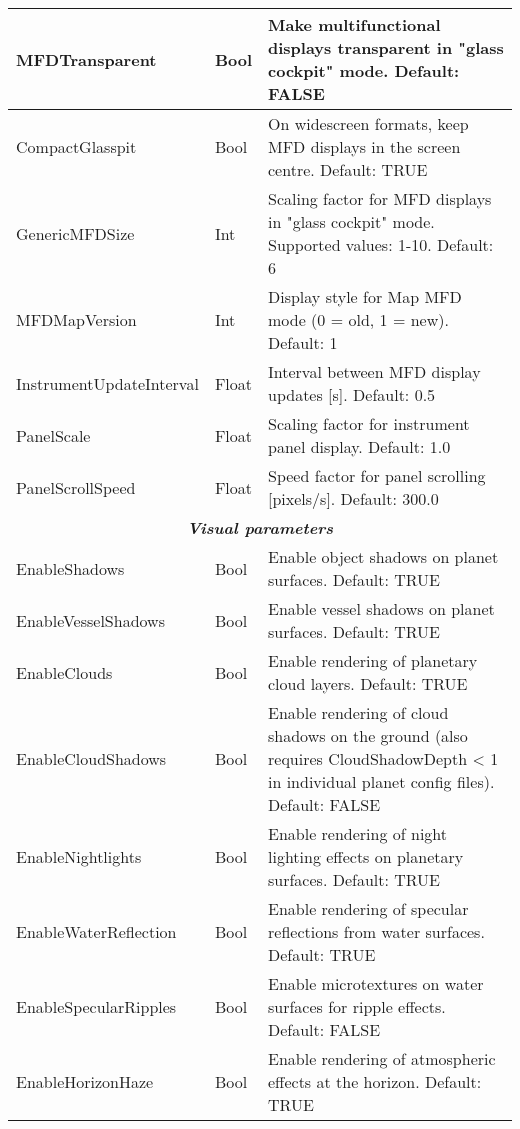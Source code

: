 \documentclass[Orbiter User Manual.tex]{subfiles}
\begin{document}
\begin{longtable}{ |p{}|p{}|p{}| }
	\hline\rule{0pt}{2ex}
	MFDTransparent & Bool & Make multifunctional displays transparent in "glass cockpit" mode. Default: FALSE\\
	\hline\rule{0pt}{2ex}
	CompactGlasspit & Bool & On widescreen formats, keep MFD displays in the screen centre. Default: TRUE\\
	\hline\rule{0pt}{2ex}
	GenericMFDSize & Int & Scaling factor for MFD displays in "glass cockpit" mode. Supported values: 1-10. Default: 6\\
	\hline\rule{0pt}{2ex}
	MFDMapVersion & Int & Display style for Map MFD mode (0 = old, 1 = new). Default: 1\\
	\hline\rule{0pt}{2ex}
	InstrumentUpdateInterval & Float & Interval between MFD display updates [s]. Default: 0.5\\
	\hline\rule{0pt}{2ex}
	PanelScale & Float & Scaling factor for instrument panel display. Default: 1.0\\
	\hline\rule{0pt}{2ex}
	PanelScrollSpeed & Float & Speed factor for panel scrolling [pixels/s]. Default: 300.0\\
	\hline
	\multicolumn{3}{|c|}{\rule{0pt}{2ex}\textbf{\textit{Visual parameters}}}\\
	\hline\rule{0pt}{2ex}
	EnableShadows & Bool & Enable object shadows on planet surfaces. Default: TRUE\\
	\hline\rule{0pt}{2ex}
	EnableVesselShadows & Bool & Enable vessel shadows on planet surfaces. Default: TRUE\\
	\hline\rule{0pt}{2ex}
	EnableClouds & Bool & Enable rendering of planetary cloud layers. Default: TRUE\\
	\hline\rule{0pt}{2ex}
	EnableCloudShadows & Bool & Enable rendering of cloud shadows on the ground (also requires CloudShadowDepth < 1 in individual planet config files). Default: FALSE\\
	\hline\rule{0pt}{2ex}
	EnableNightlights & Bool & Enable rendering of night lighting effects on planetary surfaces. Default: TRUE\\
	\hline\rule{0pt}{2ex}
	EnableWaterReflection & Bool & Enable rendering of specular reflections from water surfaces. Default: TRUE\\
	\hline\rule{0pt}{2ex}
	EnableSpecularRipples & Bool & Enable microtextures on water surfaces for ripple effects. Default: FALSE\\
	\hline\rule{0pt}{2ex}
	EnableHorizonHaze & Bool & Enable rendering of atmospheric effects at the horizon. Default: TRUE\\

\end{longtable}
\end{document}
